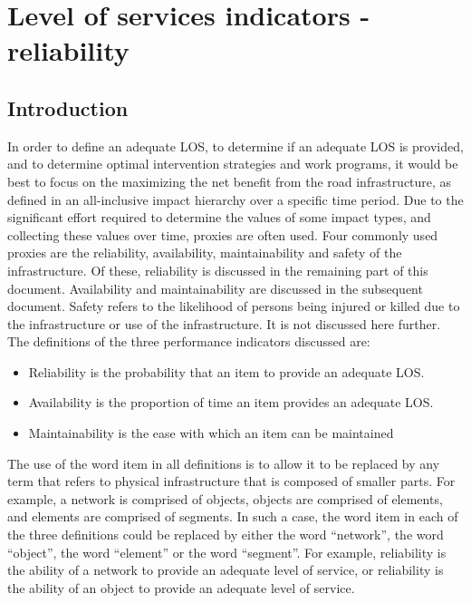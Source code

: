 %
%
%
\chapter{Level of services indicators - reliability }
\label{reliabilityc} %
\section{Introduction}
In order to define an adequate LOS, to determine if an adequate LOS is provided,
and to determine optimal intervention strategies and work programs, it would be
best to focus on the maximizing the net benefit from the road infrastructure, as
defined in an all-inclusive impact hierarchy over a specific time period. Due to
the significant effort required to determine the values of some impact types, and
collecting these values over time, proxies are often used. Four commonly used
proxies are the reliability, availability, maintainability and safety of the
infrastructure. Of these, reliability is discussed in the remaining part of this
document. Availability and maintainability are discussed in the subsequent
document. Safety refers to the likelihood of persons being injured or killed due
to the infrastructure or use of the infrastructure. It is not discussed here
further. The definitions of the three performance indicators discussed are:

\begin{itemize}
	\item Reliability is the probability that an item to provide an adequate LOS.
	\item Availability is the proportion of time an item provides an adequate LOS.
	\item Maintainability is the ease with which an item can be maintained
\end{itemize}

The use of the word item in all definitions is to allow it to be replaced by any
term that refers to physical infrastructure that is composed of smaller parts.
For example, a network is comprised of objects, objects are comprised of
elements, and elements are comprised of segments. In such a case, the word item
in each of the three definitions could be replaced by either the word
``network'', the word ``object'', the word ``element'' or the word ``segment''.
For example, reliability is the ability of a network to provide an adequate level
of service, or reliability is the ability of an object to provide an adequate
level of service.
%
